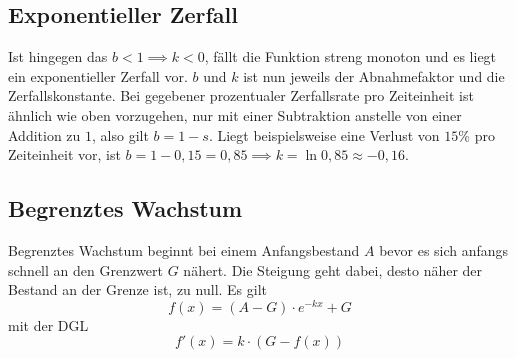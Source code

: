 \documentclass{article}
\begin{document}
\subsection{Exponentieller Zerfall}
\begin{minipage}{\dimexpr\textwidth-5cm}
Ist hingegen das ${b < 1 \implies k < 0}$, fällt die Funktion streng monoton und es liegt ein exponentieller Zerfall vor. $b$ und $k$ ist nun jeweils der Abnahmefaktor und die Zerfallskonstante. Bei gegebener prozentualer Zerfallsrate pro Zeiteinheit ist ähnlich wie oben vorzugehen, nur mit einer Subtraktion anstelle von einer Addition zu $1$, also gilt ${b=1-s}$. \newline
Liegt beispielsweise eine Verlust von $15\%$ pro Zeiteinheit vor, ist ${b=1-0,15=0,85 \implies k=\ln {0,85} \approx -0,16}$. 
\end{minipage}
\hfill
\begin{minipage}{5cm} 
 \centering
\end{minipage} 
 
\subsection{Begrenztes Wachstum}
\begin{minipage}{5cm} 
  \centering
\end{minipage}
\hfill
\begin{minipage}{\dimexpr\textwidth-5cm} 
Begrenztes Wachstum beginnt bei einem Anfangsbestand $A$ bevor es sich anfangs schnell an den Grenzwert $G$ nähert. Die Steigung geht dabei, desto näher der Bestand an der Grenze ist, zu null. Es gilt
\[
 f(x) = (A-G) \cdot e^{-kx} + G 
\]
mit der DGL
\[
 f'(x) = k \cdot (G - f(x)) 
\]
\end{minipage}
 
\end{document}
